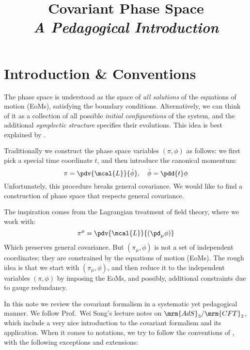\documentclass[a4paper
	,10pt
]{article}
\title{Covariant Phase Space\\[-.2ex]\large\it A Pedagogical Introduction}
\begin{document}
\maketitle
{}
\thispagestyle{empty}


\setlength{\parskip}{.1\baselineskip}
\tableofcontents
\setlength{\parskip}{\parskipnorm}

\addtocounter{section}{-1}
\section{Introduction \& Conventions}
	The phase space is understood as the space of \textit{all solutions} of the equations of motion (EoMs), satisfying the boundary conditions. Alternatively, we can think of it as a collection of all possible \textit{initial configurations} of the system, and the additional \textit{symplectic structure} specifies their evolutions. This idea is best explained by \textcite{Crnkovic:1986ex}. 
	
	Traditionally we construct the phase space variables $(\pi,\phi)$ as follows: we first pick a special time coordinate $t$, and then introduce the canonical momentum:
	\begin{equation}
		\pi = \pdv{\mcal{L}}{\dot{\phi}},
	\quad
		\dot{\phi} = \pdd{t} \phi
	\end{equation}
	Unfortunately, this procedure breaks general covariance. We would like to find a construction of phase space that respects general covariance. 
	
	The inspiration comes from the Lagrangian treatment of field theory, where we work with:
	\begin{equation}
		\pi^\mu = \pdv{\mcal{L}}{(\pd_\mu\phi)}
	\end{equation}
	Which preserves general covariance. But $(\pi_\mu,\phi)$ is not a set of independent coordinates; they are constrained by the equations of motion (EoMs). The rough idea is that we start with $(\pi_\mu,\phi)$, and then reduce it to the independent variables $(\pi,\phi)$ by imposing the EoMs, and possibly, additional constraints due to gauge redundancy. 
	
	In this note we review the covariant formalism in a systematic yet pedagogical manner. 
	We follow Prof.~Wei Song's lecture notes on $\mrm{AdS}_3/\mrm{CFT}_2$, which include a very nice introduction to the covariant formalism and its application. 
	When it comes to notations, we try to follow the conventions of \textcite{Harlow:2019yfa}, with the following exceptions and extensions: 
	
\end{document}
